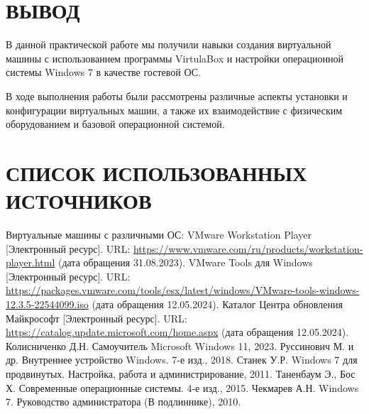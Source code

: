 \clearpage

\section*{ВЫВОД}

В данной практической работе мы получили навыки создания виртуальной машины
с использованием программы VirtulaBox
и настройки операционной системы Windows 7 в качестве гостевой ОС.\par
В ходе выполнения работы были рассмотрены различные аспекты установки
и конфигурации виртуальных машин,
а также их взаимодействие с физическим оборудованием
и базовой операционной системой.

\clearpage

\section*{СПИСОК ИСПОЛЬЗОВАННЫХ ИСТОЧНИКОВ}

\begin{thebibliography}{00}
	\bibitem{} Виртуальные машины с различными ОС: VMware Workstation Player
		[Электронный ресурс].
		URL: \url{https://www.vmware.com/ru/products/workstation-player.html}
		(дата обращения 31.08.2023).
	\bibitem{} VMware Tools для Windows [Электронный ресурс].
		URL: \url{https://packages.vmware.com/tools/esx/latest/windows/VMware-tools-windows-12.3.5-22544099.iso}
		(дата обращения 12.05.2024).
	\bibitem{} Каталог Центра обновления Майкрософт [Электронный ресурс].
		URL: \url{https://catalog.update.microsoft.com/home.aspx}
		(дата обращения 12.05.2024).
	\bibitem{} Колисниченко Д.Н. Самоучитель Microsoft Windows 11, 2023.
	\bibitem{} Руссинович М. и др. Внутреннее устройство Windows.
		7-е изд., 2018.
	\bibitem{} Станек У.Р. Windows 7 для продвинутых.
		Настройка, работа и администрирование, 2011.
	\bibitem{} Таненбаум Э., Бос Х. Современные операционные системы.
		4-е изд., 2015.
	\bibitem{} Чекмарев А.Н. Windows 7.
		Руководство администратора (В подлиннике), 2010.
\end{thebibliography}

